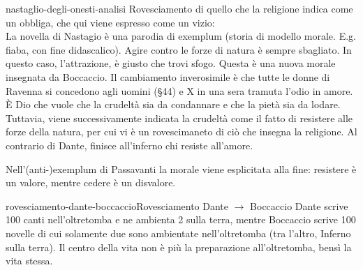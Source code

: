 \documentclass[preview]{standalone}
\begin{document}
\begin{snippet}{nastaglio-degli-onesti-analisi}
    Rovesciamento di quello che la religione indica come un obbliga, che qui viene espresso come un vizio: \\
    La novella di Nastagio è una parodia di exemplum (storia di modello morale. E.g. fiaba, con fine didascalico).
    Agire contro le forze di natura è sempre sbagliato. In questo caso, l'attrazione, è giusto che trovi sfogo.
    Questa è una nuova morale insegnata da Boccaccio.
    Il cambiamento inverosimile è che tutte le donne di Ravenna si concedono agli uomini (§44)
    e X in una sera tramuta l'odio in amore.
    È Dio che vuole che la crudeltà sia da condannare e che la pietà sia da lodare.
    Tuttavia, viene successivamente indicata la crudeltà come il fatto di resistere alle forze della natura, per cui
    vi è un rovescimaneto di ciò che insegna la religione.
    Al contrario di Dante, finisce all'inferno chi resiste all'amore.
    

    Nell'(anti-)exemplum di Passavanti la morale viene esplicitata alla fine: resistere è un valore,
    mentre cedere è un disvalore.

\end{snippet}

\begin{snippetnote}{rovesciamento-dante-boccaccio}{Rovesciamento Dante \(\rightarrow\) Boccaccio}
    Dante scrive 100 canti nell'oltretomba e ne ambienta 2 sulla terra, mentre Boccaccio scrive 100 novelle di cui solamente
    due sono ambientate nell'oltretomba (tra l'altro, Inferno sulla terra).
    Il centro della vita non è più la preparazione all'oltretomba, bensì la vita stessa.
\end{snippetnote}
\end{document}
